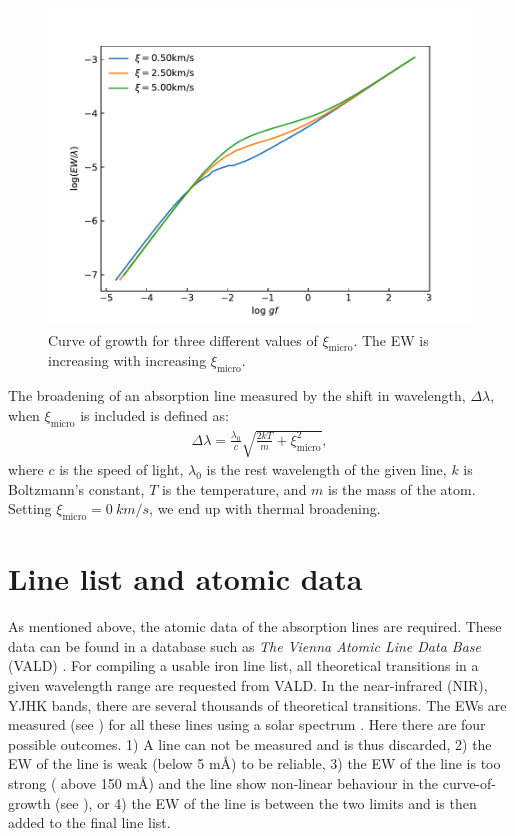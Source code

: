 \begin{figure}[htpb!]
    \centering
    \includegraphics[width=0.85\linewidth]{figures/cog_vt.pdf}
    \caption{Curve of growth for three different values of $\xi_\mathrm{micro}$. The EW is
             increasing with increasing $\xi_\mathrm{micro}$.}
    \label{fig:cog_vt}
\end{figure}

The broadening of an absorption line measured by the shift in wavelength, $\Delta\lambda$, when
$\xi_\mathrm{micro}$ is included is defined as:
\begin{align}
  \Delta\lambda = \frac{\lambda_0}{c} \sqrt{\frac{2kT}{m} + \xi_\mathrm{micro}^2},
\end{align}
where $c$ is the speed of light, $\lambda_0$ is the rest wavelength of the given line, $k$ is
Boltzmann's constant, $T$ is the temperature, and $m$ is the mass of the atom. Setting
$\xi_\mathrm{micro}=\SI{0}{km/s}$, we end up with thermal broadening.


\section{Line list and atomic data}
\label{sec:linelist}

As mentioned above, the atomic data of the absorption lines are required. These data can be found in
a database such as \emph{The Vienna Atomic Line Data Base} (VALD) \citep{VALD1,VALD2}. For compiling
a usable iron line list, all theoretical transitions in a given wavelength range are requested from
VALD. In the near-infrared (NIR), YJHK bands, there are several thousands of theoretical
transitions. The EWs are measured (see ) for all these lines using a solar
spectrum \citep[][is used here]{Hinkle1995}. Here there are four possible outcomes. 1) A line can
not be measured and is thus discarded, 2) the EW of the line is weak (below 5 m\AA{}) to be
reliable, 3) the EW of the line is too strong ( above 150 m\AA{}) and the line show non-linear
behaviour in the curve-of-growth (see ), or 4) the EW of the line is between the two
limits and is then added to the final line list.

